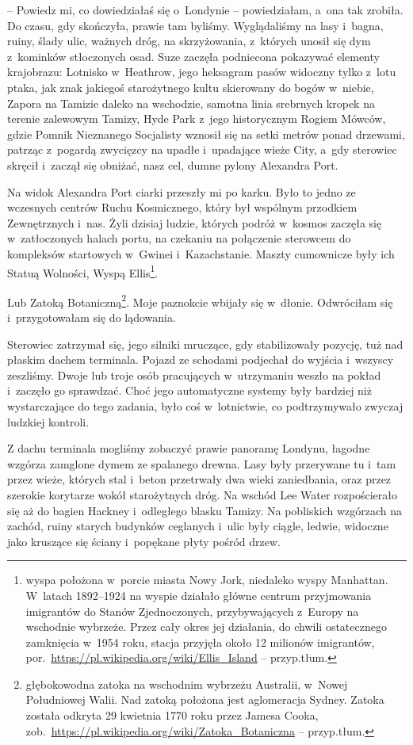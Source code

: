 \documentclass[oneside,polish,11pt,sfheadings]{mwbk}
\begin{document}
-- Powiedz mi, co dowiedziałaś się o~Londynie -- powiedziałam, a~ona tak
zrobiła. Do czasu, gdy skończyła, prawie tam byliśmy. Wyglądaliśmy na
lasy i~bagna, ruiny, ślady ulic, ważnych dróg, na skrzyżowania, z~których unosił się dym z~kominków stłoczonych osad. Suze zaczęła
podniecona pokazywać elementy krajobrazu: Lotnisko w~Heathrow, jego
heksagram pasów widoczny tylko z~lotu ptaka, jak znak jakiegoś
starożytnego kultu skierowany do bogów w~niebie, Zapora na Tamizie
daleko na wschodzie, samotna linia srebrnych kropek na terenie zalewowym
Tamizy, Hyde Park z~jego historycznym Rogiem Mówców, gdzie Pomnik
Nieznanego Socjalisty wznosił się na setki metrów ponad drzewami,
patrząc z~pogardą zwycięzcy na upadłe i~upadające wieże City, a~gdy
sterowiec skręcił i~zaczął się obniżać, nasz cel, dumne pylony Alexandra
Port.

Na widok Alexandra Port ciarki przeszły mi po karku. Było to jedno ze
wczesnych centrów Ruchu Kosmicznego, który był wspólnym przodkiem
Zewnętrznych i~nas. Żyli dzisiaj ludzie, których podróż w~kosmos zaczęła
się w~zatłoczonych halach portu, na czekaniu na połączenie sterowcem do
kompleksów startowych w~Gwinei i~Kazachstanie. Maszty cumownicze były
ich Statuą Wolności, Wyspą Ellis\footnote{ wyspa położona w~porcie miasta Nowy
Jork, niedaleko wyspy Manhattan. W~latach 1892--1924 na wyspie działało
główne centrum przyjmowania imigrantów do Stanów Zjednoczonych,
przybywających z~Europy na wschodnie wybrzeże. Przez cały okres jej
działania, do chwili ostatecznego zamknięcia w~1954 roku, stacja
przyjęła około 12 milionów imigrantów,
por.~\url{https://pl.wikipedia.org/wiki/Ellis\_Island} -- przyp.tłum.}.

Lub Zatoką Botaniczną\footnote{głębokowodna zatoka na wschodnim wybrzeżu
Australii, w~Nowej Południowej Walii. Nad zatoką położona jest
aglomeracja Sydney. Zatoka została odkryta 29 kwietnia 1770 roku przez
Jamesa Cooka,
zob.~\url{https://pl.wikipedia.org/wiki/Zatoka\_Botaniczna} -- przyp.tłum.}. Moje paznokcie wbijały się w~dłonie. Odwróciłam się i~przygotowałam się do lądowania.

Sterowiec zatrzymał się, jego silniki mruczące, gdy stabilizowały
pozycję, tuż nad płaskim dachem terminala. Pojazd ze schodami podjechał
do wyjścia i~wszyscy zeszliśmy. Dwoje lub troje osób pracujących w~utrzymaniu weszło na pokład i~zaczęło go sprawdzać. Choć jego
automatyczne systemy były bardziej niż wystarczające do tego zadania,
było coś w~lotnictwie, co podtrzymywało zwyczaj ludzkiej kontroli.

Z dachu terminala mogliśmy zobaczyć prawie panoramę Londynu, łagodne
wzgórza zamglone dymem ze spalanego drewna. Lasy były przerywane tu i~tam przez wieże, których stal i~beton przetrwały dwa wieki zaniedbania,
oraz przez szerokie korytarze wokół starożytnych dróg. Na wschód Lee
Water rozpościerało się aż do bagien Hackney i~odległego blasku Tamizy.
Na pobliskich wzgórzach na zachód, ruiny starych budynków ceglanych i~ulic były ciągle, ledwie, widoczne jako kruszące się ściany i~popękane
płyty pośród drzew.
\end{document}
